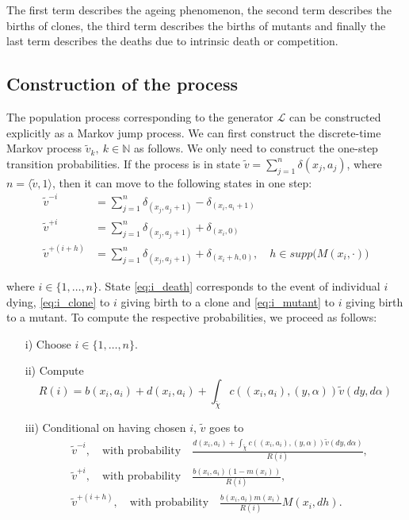 \documentclass[11pt, a4paper]{article}
\theoremstyle{definition}
\begin{document}
    The first term describes the ageing phenomenon, the second term describes the births of clones, the third term describes the births of mutants and finally the last term describes the deaths due to intrinsic death or competition.

\subsection{Construction of the process}
    The population process corresponding to the generator $\mathcal{L}$ can be constructed explicitly as a Markov jump process. We can first construct the discrete-time Markov process $\tilde{v}_k,~k\in \mathbb{N}$ as follows. We only need to construct the one-step transition probabilities. If the process is in state $\tilde{v} = \sum_{j=1}^n \delta(x_j,a_j)$, where $n = \langle \tilde{v}, 1\rangle$, then it can move to the following states in one step:
    \begin{align}
        \tilde{v}^{-i} &= \sum_{j=1}^n \delta_{(x_j,a_j+1)} - \delta_{(x_i,a_i+1)} \label{eq:i_death}\\
        \tilde{v}^{+i} &= \sum_{j=1}^n \delta_{(x_j,a_j+1)} + \delta_{(x_i,0)} \label{eq:i_clone}\\
        \tilde{v}^{+(i+h)} &= \sum_{j=1}^n \delta_{(x_j,a_j+1)} + \delta_{(x_i+h,0)},\quad h\in supp \big ( M(x_i,\cdot) \big ) \label{eq:i_mutant}
    \end{align}

    \noindent where $i\in \{1,\ldots,n\}$. State \eqref{eq:i_death} corresponds to the event of individual $i$ dying, \eqref{eq:i_clone} to $i$ giving birth to a clone and \eqref{eq:i_mutant} to $i$ giving birth to a mutant.
    To compute the respective probabilities, we proceed as follows:
    \begin{itemize}
        \item[i)] Choose $i \in \{1, \ldots, n\}$.
        \item[ii)] Compute
            \begin{equation}
                R(i) = b(x_i,a_i) + d(x_i,a_i) + \int_{\tilde{\chi}} c((x_i,a_i),(y,\alpha)) \tilde{v}(dy,d\alpha)
            \end{equation}
        \item[iii)] Conditional on having chosen $i$, $\tilde{v}$ goes to
            \begin{align}
                &\tilde{v}^{-i},\quad \text{with probability}\quad \frac{d(x_i,a_i) + \int_{\tilde{\chi}} c((x_i,a_i),(y,\alpha)) \tilde{v}(dy,d\alpha)}{R(i)},\\
                &\tilde{v}^{+i},\quad \text{with probability}\quad \frac{b(x_i,a_i)(1 - m(x_i))}{R(i)},\\
                &\tilde{v}^{+(i+h)},\quad \text{with probability}\quad \frac{b(x_i,a_i)m(x_i)}{R(i)} M(x_i,dh).
            \end{align}
    \end{itemize}
\end{document}
